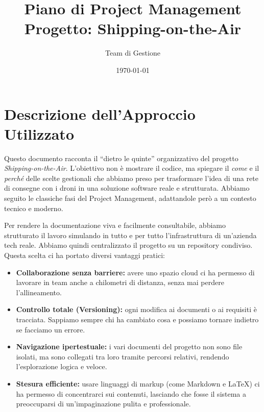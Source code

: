 \documentclass[12pt, a4paper]{article}
\title{\textbf{Piano di Project Management}\\ \large Progetto: Shipping-on-the-Air}
\author{Team di Gestione}
\date{\today}
\begin{document}
\maketitle
\tableofcontents
\newpage

\section{Descrizione dell'Approccio Utilizzato}
Questo documento racconta il ``dietro le quinte'' organizzativo del progetto \textit{Shipping-on-the-Air}. L'obiettivo non è mostrare il codice, ma spiegare il \textit{come} e il \textit{perché} delle scelte gestionali che abbiamo preso per trasformare l'idea di una rete di consegne con i droni in una soluzione software reale e strutturata. Abbiamo seguito le classiche fasi del Project Management, adattandole però a un contesto tecnico e moderno.

Per rendere la documentazione viva e facilmente consultabile, abbiamo strutturato il lavoro simulando in tutto e per tutto l'infrastruttura di un'azienda tech reale. Abbiamo quindi centralizzato il progetto su un repository condiviso. Questa scelta ci ha portato diversi vantaggi pratici:
\begin{itemize}[label=\textbullet]
    \item \textbf{Collaborazione senza barriere:} avere uno spazio cloud ci ha permesso di lavorare in team anche a chilometri di distanza, senza mai perdere l'allineamento.
    \item \textbf{Controllo totale (Versioning):} ogni modifica ai documenti o ai requisiti è tracciata. Sappiamo sempre chi ha cambiato cosa e possiamo tornare indietro se facciamo un errore.
    \item \textbf{Navigazione ipertestuale:} i vari documenti del progetto non sono file isolati, ma sono collegati tra loro tramite percorsi relativi, rendendo l'esplorazione logica e veloce.
    \item \textbf{Stesura efficiente:} usare linguaggi di markup (come Markdown e LaTeX) ci ha permesso di concentrarci sui contenuti, lasciando che fosse il sistema a preoccuparsi di un'impaginazione pulita e professionale.
\end{itemize}
\end{document}
